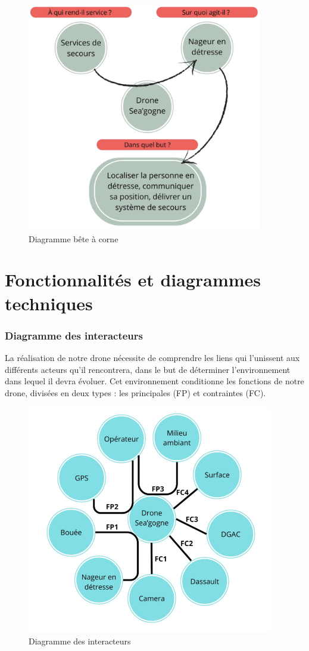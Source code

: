 \documentclass[a4paper,12pt,french]{report}
\begin{document}
\begin{figure}[h]
    \centering
    \includegraphics[height=10cm]{figures/bete.png}
    \caption{Diagramme bête à corne}
    \label{bete}
\end{figure}

\section{Fonctionnalités et diagrammes techniques}

\subsubsection*{Diagramme des interacteurs}

La réalisation de notre drone nécessite de comprendre les liens qui l’unissent aux différents acteurs qu’il rencontrera, dans le but de déterminer l’environnement dans lequel il devra évoluer. Cet environnement conditionne les fonctions de notre drone, divisées en deux types : les principales (FP) et contraintes (FC).

\begin{figure}[h]
    \centering
    \includegraphics[height=10cm]{figures/diagex.png}
    \caption{Diagramme des interacteurs}
    \label{diagex}
\end{figure}
\end{document}
